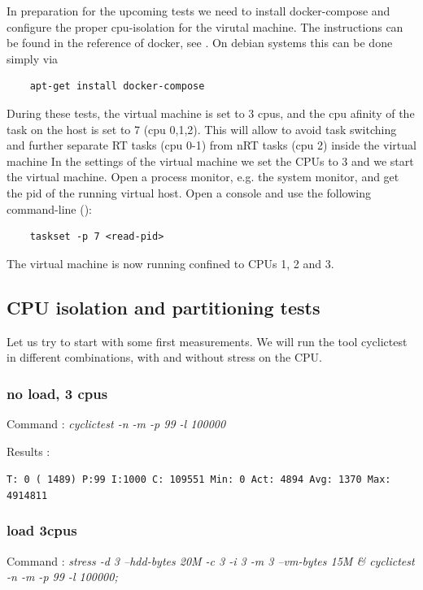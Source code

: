 \documentclass[]{scrartcl}
\begin{document}
In preparation for the upcoming tests we need to install docker-compose and configure the proper cpu-isolation for the virutal machine.
The instructions can be found in the reference of docker, see \cite{docker05}. 
On debian systems this can be done simply via 

\begin{verbatim}
	apt-get install docker-compose
\end{verbatim}

During these tests, the virtual machine is set to 3 cpus, and the cpu afinity of the task on the host is set to 7 (cpu 0,1,2). This will allow to avoid task switching and further separate RT tasks (cpu 0-1) from nRT tasks (cpu 2) inside the virtual machine
In the settings of the virtual machine we set the CPUs to 3 and we start the virtual machine.  Open a process monitor, e.g. the system monitor, and get the pid of the running virtual host. Open a console and use the following command-line (\cite{vbox01}):

\begin{verbatim}
	taskset -p 7 <read-pid>
\end{verbatim} 

The virtual machine is now running confined to CPUs 1, 2 and 3.

\subsection{CPU isolation and partitioning tests}

Let us try to start with some first measurements. We will run the tool cyclictest in different combinations, with and without stress on the CPU.

\subsubsection{no load, 3 cpus}

\noindent Command : \textit{cyclictest -n -m -p 99 -l 100000}

\noindent Results :

\noindent \texttt{T: 0 ( 1489) P:99 I:1000 C: 109551 Min:      0 Act: 4894 Avg: 1370 Max:  4914811}

\subsubsection{load 3cpus}

\noindent Command : \textit{stress -d 3 --hdd-bytes 20M -c 3 -i 3 -m 3 --vm-bytes 15M \& cyclictest -n -m -p 99 -l 100000;}
\end{document}

